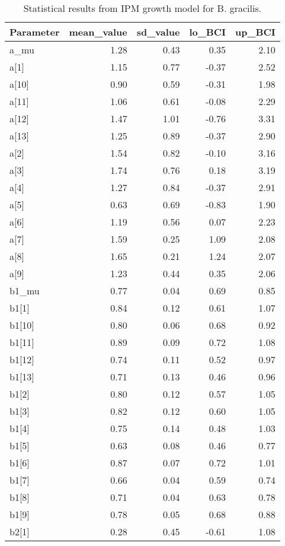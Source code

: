 \documentclass[12pt,]{article}
\begin{document}
\begin{table}[ht]
\centering
\caption{Statistical results from IPM growth model for B. gracilis.} 
{\footnotesize
\begin{tabular}{lrrrr}
  \hline
Parameter & mean\_value & sd\_value & lo\_BCI & up\_BCI \\ 
  \hline
a\_mu & 1.28 & 0.43 & 0.35 & 2.10 \\ 
  a[1] & 1.15 & 0.77 & -0.37 & 2.52 \\ 
  a[10] & 0.90 & 0.59 & -0.31 & 1.98 \\ 
  a[11] & 1.06 & 0.61 & -0.08 & 2.29 \\ 
  a[12] & 1.47 & 1.01 & -0.76 & 3.31 \\ 
  a[13] & 1.25 & 0.89 & -0.37 & 2.90 \\ 
  a[2] & 1.54 & 0.82 & -0.10 & 3.16 \\ 
  a[3] & 1.74 & 0.76 & 0.18 & 3.19 \\ 
  a[4] & 1.27 & 0.84 & -0.37 & 2.91 \\ 
  a[5] & 0.63 & 0.69 & -0.83 & 1.90 \\ 
  a[6] & 1.19 & 0.56 & 0.07 & 2.23 \\ 
  a[7] & 1.59 & 0.25 & 1.09 & 2.08 \\ 
  a[8] & 1.65 & 0.21 & 1.24 & 2.07 \\ 
  a[9] & 1.23 & 0.44 & 0.35 & 2.06 \\ 
  b1\_mu & 0.77 & 0.04 & 0.69 & 0.85 \\ 
  b1[1] & 0.84 & 0.12 & 0.61 & 1.07 \\ 
  b1[10] & 0.80 & 0.06 & 0.68 & 0.92 \\ 
  b1[11] & 0.89 & 0.09 & 0.72 & 1.08 \\ 
  b1[12] & 0.74 & 0.11 & 0.52 & 0.97 \\ 
  b1[13] & 0.71 & 0.13 & 0.46 & 0.96 \\ 
  b1[2] & 0.80 & 0.12 & 0.57 & 1.05 \\ 
  b1[3] & 0.82 & 0.12 & 0.60 & 1.05 \\ 
  b1[4] & 0.75 & 0.14 & 0.48 & 1.03 \\ 
  b1[5] & 0.63 & 0.08 & 0.46 & 0.77 \\ 
  b1[6] & 0.87 & 0.07 & 0.72 & 1.01 \\ 
  b1[7] & 0.66 & 0.04 & 0.59 & 0.74 \\ 
  b1[8] & 0.71 & 0.04 & 0.63 & 0.78 \\ 
  b1[9] & 0.78 & 0.05 & 0.68 & 0.88 \\ 
  b2[1] & 0.28 & 0.45 & -0.61 & 1.08 \\ 

\end{tabular}}
\end{table}
\end{document}

